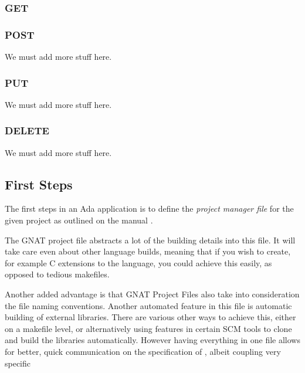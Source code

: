 \subsubsection{GET} 

\subsubsection{POST}
We must add more stuff here.

\subsubsection{PUT}
We must add more stuff here.

\subsubsection{DELETE} 
We must add more stuff here.

\subsection{First Steps}
The first steps in an Ada application is to define the \textit{project manager 
file} for the given project as outlined on the manual \cite{GNATintro}.

The GNAT project file abstracts a lot of the building details into this file.
It will take care even about other language builds, meaning that if you wish to
create, for example C extensions to the language, you could achieve this
easily, as opposed to tedious makefiles. 

Another added advantage is that GNAT Project Files also take into consideration 
the file naming conventions. Another automated feature in this file is automatic
building of external libraries. There are various other ways to achieve this,
either on a makefile level, or alternatively using features in certain SCM tools
to clone and build the libraries automatically. However having everything in one
file allows for better, quick communication on the specification of ,
albeit coupling very specific 

